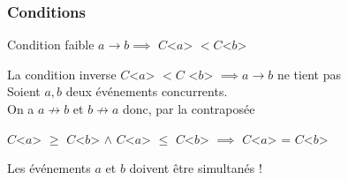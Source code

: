 \documentclass[compress]{beamer}
\begin{document}
\begin{frame}
\frametitle{Conditions}
\begin{block}{Condition faible}
$a \rightarrow b \implies$ $C$<$a$> $ < C$<$b$>
\end{block}
\bigskip
La condition inverse $C$<$a$> $ < C$ <$b$> $\implies a \rightarrow b$ ne tient pas\\ \bigskip
Soient $a, b$ deux événements concurrents. \\On a $a \not\rightarrow b$  et $b \not\rightarrow a$ donc, par la contraposée\\
\begin{center}
$C$<$a$>  $\geq$ $C$<$b$> $\land$ $C$<$a$>  $\leq$ $C$<$b$>  $\implies$ $C$<$a$> = $C$<$b$>
\end{center}
Les événements $a$ et $b$ doivent être simultanés !
\end{frame}
\end{document}
